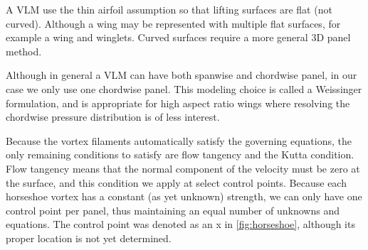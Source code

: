 \documentclass{article}
\begin{document}
A VLM use the thin airfoil assumption so that  lifting surfaces are flat (not curved).  Although a wing may be represented with multiple flat surfaces, for example a wing and winglets.  Curved surfaces require a more general 3D panel method.

Although in general a VLM can have both spanwise and chordwise panel, in our case we only use one chordwise panel.  This modeling choice is called a Weissinger formulation, and is appropriate for high aspect ratio wings where resolving the chordwise pressure distribution is of less interest.  



Because the vortex filaments automatically satisfy the governing equations, the only remaining conditions to satisfy are flow tangency and the Kutta condition.  Flow tangency means that the normal component of the velocity must be zero at the surface, and this condition we apply at select control points.  Because each horseshoe vortex has a constant (as yet unknown) strength, we can only have one control point per panel, thus maintaining an equal number of unknowns and equations.  The control point was denoted as an x in \cref{fig:horseshoe}, although its proper location is not yet determined.



\end{document}
